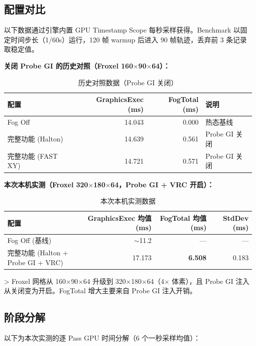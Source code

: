 \documentclass[11pt,a4paper]{article}
\begin{document}
\subsection{配置对比}

以下数据通过引擎内置 GPU Timestamp Scope 每秒采样获得。Benchmark 以固定时间步长（1/60s）运行，120 帧 warmup 后进入 90 帧轨迹，丢弃前 3 条记录取稳定值。

\textbf{关闭 Probe GI 的历史对照（Froxel 160$\times$90$\times$64）：}

\begin{table}[H]
\centering
\begin{tabular}{lrrl}
\toprule
配置 & GraphicsExec (ms) & FogTotal (ms) & 说明 \\
\midrule
Fog Off & 14.043 & 0.000 & 热态基线 \\
完整功能 (Halton) & 14.639 & 0.561 & Probe GI 关闭 \\
完整功能 (FAST XY) & 14.721 & 0.571 & Probe GI 关闭 \\
\bottomrule
\end{tabular}
\caption{历史对照数据（Probe GI 关闭）}
\end{table}

\textbf{本次本机实测（Froxel 320$\times$180$\times$64，Probe GI + VRC 开启）：}

\begin{table}[H]
\centering
\begin{tabular}{lrrr}
\toprule
配置 & GraphicsExec 均值 (ms) & FogTotal 均值 (ms) & StdDev (ms) \\
\midrule
Fog Off (基线) & $\sim$11.2 & --- & --- \\
完整功能 (Halton + Probe GI + VRC) & 17.173 & \textbf{6.508} & 0.183 \\
\bottomrule
\end{tabular}
\caption{本次本机实测数据}
\end{table}

> Froxel 网格从 160$\times$90$\times$64 升级到 320$\times$180$\times$64（4$\times$ 体素），且 Probe GI 注入从关闭变为开启。FogTotal 增大主要来自 Probe GI 注入开销。

\subsection{阶段分解}

以下为本次实测的逐 Pass GPU 时间分解（6 个一秒采样均值）：
\end{document}
